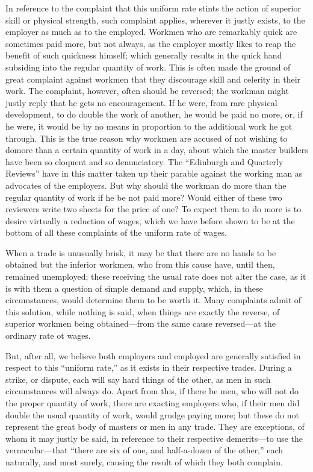 In reference to the complaint that this uniform rate stints the action
of superior skill or physical strength, such complaint applies, wherever
it justly exists, to the employer as much as to the employed. Workmen
who are remarkably quick are sometimes paid more, but not always, as the
employer mostly likes to reap the benefit of such quickness himself;
which generally results in the quick hand subsiding into the regular
quantity of work. This is often made the ground of great complaint
against workmen that they discourage skill and celerity in their work.
The complaint, however, often should be reversed; the workman might
justly reply that he gets no encouragement. If he were, from rare
physical development, to do double the work of another, he would be paid
no more, or, if he were, it would be by no means in proportion to the
additional work he got through. This is the true reason why workmen are
accused of not wishing to domore than a certain quantity of work in a
day, about which the master builders have been so eloquent and so
denunciatory. The ``Edinburgh and Quarterly Reviews'' have in this
matter taken up their parable against the working man as advocates of
the employers. But why should the workman do more than the regular
quantity of work if he be not paid more? Would either of these two
reviewers write two sheets for the price of one? To expect them to do
more is to desire virtually a reduction of wages, which we have before
shown to be at the bottom of all these complaints of the uniform rate of
wages.

When a trade is unusually brisk, it may be that there are no hands to be
obtained but the inferior workmen, who from this cause have, until then,
remained unemployed; these receiving the usual rate does not alter the
case, as it is with them a question of simple demand and supply, which,
in these circumstances, would determine them to be worth it. Many
complaints admit of this solution, while nothing is said, when things
are exactly the reverse, of superior workmen being obtained---from the
same cause reversed---at the ordinary rate ot wages.

But, after all, we believe both employers and employed are generally
satisfied in respect to this ``uniform rate,'' as it exists in their
respective trades. During a strike, or dispute, each will say hard
things of the other, as men in such circumstances will always do. Apart
from this, if there be men, who will not do the proper quantity of work,
there are exacting employers who, if their men did double the usual
quantity of work, would grudge paying more; but these do not represent
the great body of masters or men in any trade. They are exceptions, of
whom it may justly be said, in reference to their respective
demerits---to use the vernacular---that ``there are six of one, and
half-a-dozen of the other,'' each naturally, and most surely, causing
the result of which they both complain.

